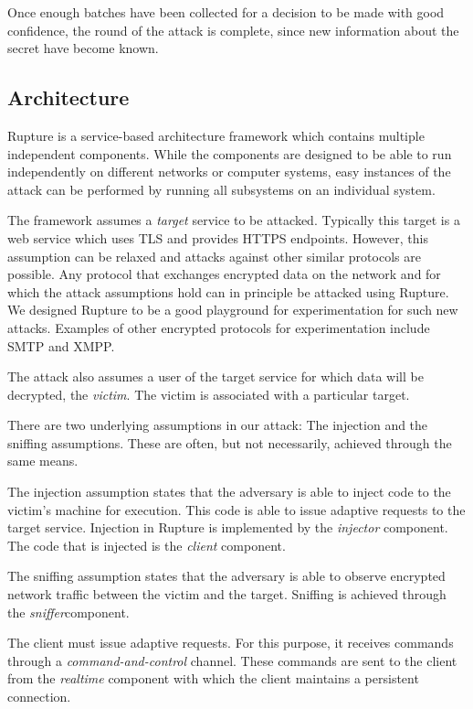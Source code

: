 Once enough batches have been collected for a decision to be made with good
confidence, the round of the attack is complete, since new information about the
secret have become known.

\subsection{Architecture}\label{app:rupture}
Rupture is a service-based architecture framework which contains multiple
independent components. While the components are designed to be able to run
independently on different networks or computer systems, easy instances of the
attack can be performed by running all subsystems on an individual system.

The framework assumes a \textit{target} service to be attacked. Typically
this target is a web service which uses TLS and
provides HTTPS endpoints. However, this assumption can
be relaxed and attacks against other similar protocols are possible. Any
protocol that exchanges encrypted data on the network and for which
the attack assumptions hold can in principle be attacked using Rupture. We
designed Rupture to be a good playground for experimentation for such new
attacks. Examples of other encrypted protocols for experimentation
include SMTP and XMPP.

The attack also assumes a user of the target service for which data will be
decrypted, the \textit{victim}. The victim is associated with a particular
target.

There are two underlying assumptions in our attack: The injection and the
sniffing assumptions. These are often, but not necessarily, achieved through the same means.

The injection assumption states that the adversary is able to inject code to the
victim's machine for execution. This code is able to issue adaptive requests to
the target service. Injection in Rupture is implemented by the
\textit{injector} component. The code that is injected is the \textit{client}
component.

The sniffing assumption states that the adversary is able to observe encrypted network
traffic between the victim and the target.
Sniffing is achieved through the \textit{sniffer}component.

The client must issue adaptive requests. For this purpose, it receives commands
through a \textit{command-and-control} channel. These commands are sent to the
client from the \textit{realtime} component with which the client maintains a
persistent connection.

